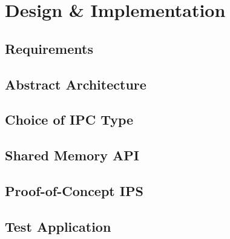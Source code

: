 %
%
\chapter{Design \& Implementation}
\label{sec:design}

\section{Requirements}

\section{Abstract Architecture}

\section{Choice of IPC Type}

\section{Shared Memory API}

\section{Proof-of-Concept IPS}

\section{Test Application}


